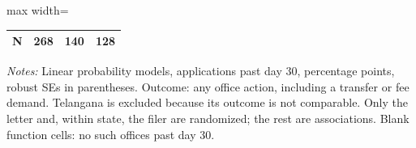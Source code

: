 \begin{table}[!htbp]
\begin{adjustbox}{max width=\textwidth}
\begin{threeparttable}
\begin{tabular}{lccc}
N & 268 & 140 & 128 \\
\bottomrule
\end{tabular}
\begin{tablenotes}[flushleft]\footnotesize
\item \textit{Notes:} Linear probability models, applications past day 30, percentage points, robust SEs in parentheses. Outcome: any office action, including a transfer or fee demand. Telangana is excluded because its outcome is not comparable. Only the letter and, within state, the filer are randomized; the rest are associations. Blank function cells: no such offices past day 30.
\end{tablenotes}
\end{threeparttable}
\end{adjustbox}
\end{table}

